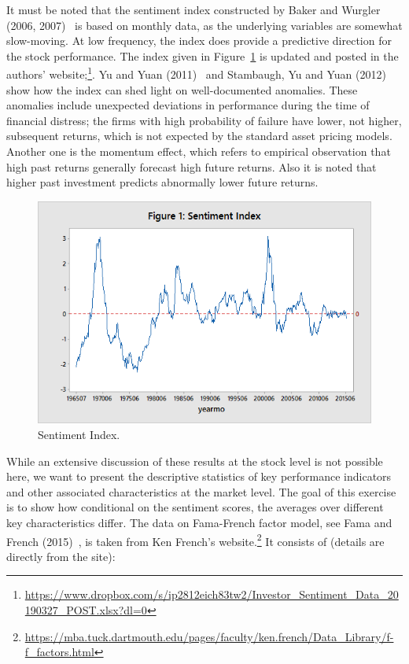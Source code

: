  
It must be noted that the sentiment index constructed by Baker and Wurgler (2006, 2007)~\cite{baker2006investor,baker2007investor} is based on monthly data, as the underlying variables are somewhat slow-moving. At low frequency, the index does provide a predictive direction for the stock performance. The index given in Figure~\ref{fig:sentimentindex} is updated and posted in the authors' website;\footnote{\url{https://www.dropbox.com/s/ip2812eich83tw2/Investor_Sentiment_Data_20190327_POST.xlsx?dl=0}}. Yu and Yuan (2011)~\cite{yuyuan} and Stambaugh, Yu and Yuan (2012)~\cite{stamb} show how the index can shed light on well-documented anomalies. These anomalies include unexpected deviations in performance during the time of financial distress; the firms with high probability of failure have lower, not higher, subsequent returns, which is not expected by the standard asset pricing models. Another one is the momentum effect, which refers to empirical observation that high past returns generally forecast high future returns. Also it is noted that higher past investment predicts abnormally lower future returns. 
	 \begin{figure}[!ht]
	\centering
	\includegraphics[width=\textwidth]{chapters/chapter_news_an/figures/ch4sec1sentimentindex.png}
	\caption{Sentiment Index.\label{fig:sentimentindex}}
	\end{figure}


While an extensive discussion of these results at the stock level is not possible here, we want to present the descriptive statistics of key performance indicators and other associated characteristics at the market level. The goal of this exercise is to show how conditional on the sentiment scores, the averages over different key characteristics differ. The data on Fama-French factor model, see Fama and French (2015)~\cite{fama2015international}, is taken from Ken French's website.\footnote{\url{https://mba.tuck.dartmouth.edu/pages/faculty/ken.french/Data_Library/f-f_factors.html}} It consists of (details are directly from the site):


